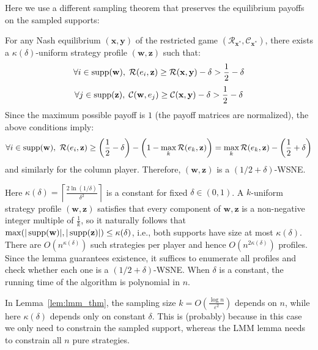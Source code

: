 Here we use a different sampling theorem that preserves the equilibrium payoffs on the sampled supports:

\begin{lemma}
  For any Nash equilibrium \((\mathbf{x}, \mathbf{y})\) of the restricted game \((\mathcal{R}_{\mathbf{x}^*}, \mathcal{C}_{\mathbf{x}^*})\), there exists a \(\kappa(\delta)\)-uniform strategy profile \((\mathbf{w}, \mathbf{z})\) such that:
  \[
    \forall i \in \operatorname{supp}(\mathbf{w}),\; \mathcal{R}(e_i, \mathbf{z}) \ge \mathcal{R}(\mathbf{x}, \mathbf{y}) - \delta > \frac12 - \delta
  \]
  \[
    \forall j \in \operatorname{supp}(\mathbf{z}),\; \mathcal{C}(\mathbf{w}, e_j) \ge \mathcal{C}(\mathbf{x}, \mathbf{y}) - \delta > \frac12 - \delta
  \]
  Since the maximum possible payoff is \(1\) (the payoff matrices are normalized), the above conditions imply:
  \[
    \forall i \in \supp(\mathbf{w}),\ \mathcal{R}(e_i, \mathbf{z}) \ge \left(\frac12 - \delta\right) - \left(1 - \max_k \mathcal{R}(e_k, \mathbf{z})\right) = \max_k \mathcal{R}(e_k, \mathbf{z}) - \left(\frac12 + \delta\right)
  \]
  and similarly for the column player. Therefore, \((\mathbf{w}, \mathbf{z})\) is a \((1/2+\delta)\)-WSNE.
\end{lemma}

Here \(\kappa(\delta) = \left\lceil \frac{2 \ln (1/\delta)}{\delta^2} \right\rceil\) is a constant for fixed \(\delta \in (0,1)\). A \(k\)-uniform strategy profile \((\mathbf{w}, \mathbf{z})\) satisfies that every component of \(\mathbf{w}, \mathbf{z}\) is a non-negative integer multiple of \(\frac{1}{k}\), so it naturally follows that \(\max(|\operatorname{supp}(\mathbf{w})|, |\operatorname{supp}(\mathbf{z})|) \le \kappa(\delta)\), i.e., both supports have size at most \(\kappa(\delta)\). There are \(O(n^{\kappa(\delta)})\) such strategies per player and hence \(O(n^{2\kappa(\delta)})\) profiles. Since the lemma guarantees existence, it suffices to enumerate all profiles and check whether each one is a \((1/2+\delta)\)-WSNE. When \(\delta\) is a constant, the running time of the algorithm is polynomial in \(n\).

\begin{remark}
  In Lemma~\ref{lem:lmm_thm}, the sampling size \(k = O\left(\frac{\log n}{\varepsilon^2}\right)\) depends on \(n\), while here \(\kappa(\delta)\) depends only on constant \(\delta\). This is (probably) because in this case we only need to constrain the sampled support, whereas the LMM lemma needs to constrain all \(n\) pure strategies.
\end{remark}


